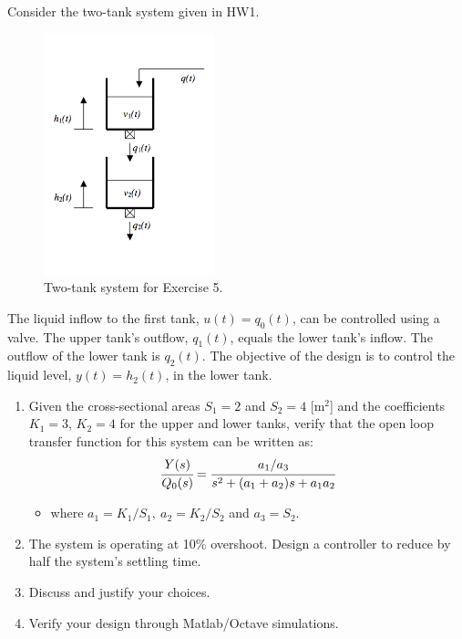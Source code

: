 \documentclass[a4paper,11pt]{article}
\begin{document}
\noindent  Consider the two-tank system given in HW1.\\
 
\begin{figure}[ht!]
\begin{center}\includegraphics[width=0.44\textwidth]{Figures/tanks_ex} \end{center}
 \vskip-0.5cm\caption{Two-tank system for Exercise 5.}
\label{fig:ex3}
\end{figure}

\noindent  The liquid inflow to the first tank, $u(t)=q_0(t)$, can be controlled using a valve. The upper tank's outflow, $q_1(t)$, equals the lower tank's inflow. The outflow of the lower tank is  $q_2(t)$. The objective of the design is to control the liquid level, $y(t)=h_2(t)$, in the lower tank. 

\begin{enumerate}
\item Given the cross-sectional areas $S_1=2$ and $S_2=4$ [m$^2$] and the coefficients $K_1=3$,  $K_2=4$  for the upper and lower tanks, verify that the open loop transfer function for this system can be written as:
\begin{equation*}
\cfrac{Y(s)}{Q_0(s)}=\cfrac{a_1/a_3}{s^2+(a_1+a_2)s+a_1a_2}
\end{equation*}
\begin{itemize}
\item where $a_1=K_1/S_1, \  a_2=K_2/S_2$ and $a_3=S_2$.
\end{itemize}
\item The system is operating at 10\% overshoot. Design a controller to reduce by half the system's settling time.
\item Discuss and justify your choices.
\item Verify your design through Matlab/Octave simulations.
\end{enumerate}
\end{document}
